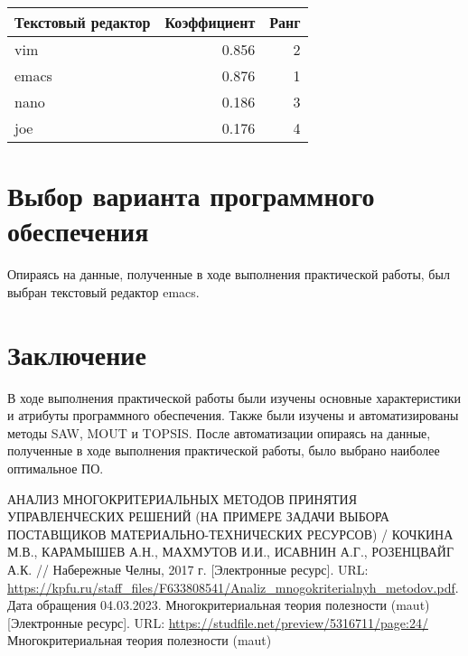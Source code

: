 \begin{table}[h!tp]
	\centering
	\caption{}
	\label{table:topsis:result}
	\begin{tabular}{|l|r|r|}
		\hline Текстовый редактор & Коэффициент & Ранг\\ \hline
		vim & 0.856 & 2\\ \hline
		emacs & 0.876 & 1\\ \hline
		nano & 0.186 & 3\\ \hline
		joe & 0.176 & 4\\ \hline
	\end{tabular}
\end{table}

\section{Выбор варианта программного обеспечения}
Опираясь на данные, полученные в ходе выполнения практической
работы, был выбран текстовый редактор emacs.

\clearpage

\section*{\LARGE Заключение}
В ходе выполнения практической работы были изучены основные характеристики и
атрибуты программного обеспечения. Также были изучены и
автоматизированы методы SAW, MOUT и TOPSIS. После автоматизации
опираясь на данные, полученные в ходе выполнения практической работы,
было выбрано наиболее оптимальное ПО.

\newpage

\begin{thebibliography}{0}
		АНАЛИЗ МНОГОКРИТЕРИАЛЬНЫХ МЕТОДОВ ПРИНЯТИЯ
		УПРАВЛЕНЧЕСКИХ РЕШЕНИЙ
		(НА ПРИМЕРЕ ЗАДАЧИ ВЫБОРА ПОСТАВЩИКОВ
		МАТЕРИАЛЬНО-ТЕХНИЧЕСКИХ РЕСУРСОВ) /
		КОЧКИНА М.В., КАРАМЫШЕВ А.Н., МАХМУТОВ И.И.,
		ИСАВНИН А.Г., РОЗЕНЦВАЙГ А.К. // Набережные Челны, 2017 г.
		[Электронные ресурс]. URL:
		\url{https://kpfu.ru/staff_files/F633808541/Analiz_mnogokriterialnyh_metodov.pdf}.
		Дата обращения 04.03.2023.
	 Многокритериальная теория полезности (maut)
		[Электронные ресурс]. URL:
		\url{https://studfile.net/preview/5316711/page:24/}
	 Многокритериальная теория полезности (maut)
\end{thebibliography}
